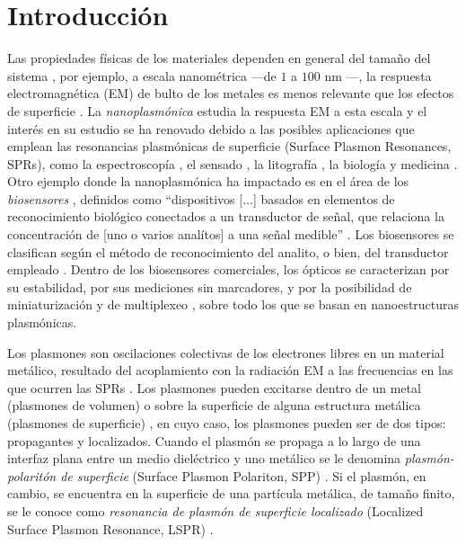 \chapter*{Introducción}
\label{chapter:Motivacion}


Las propiedades físicas de los materiales dependen en general del tamaño del sistema \cite{boverhof2015comparative}, por ejemplo, a escala nanom\'etrica ---de $1$ a $100$ nm \cite{boverhof2015comparative}---, la respuesta electromagn\'etica (EM) de bulto de los metales es menos relevante que los efectos de superficie \cite{zhao2008methods}.  La \emph{nanoplasm\'onica} estudia la respuesta EM a esta escala y el inter\'es en su estudio se ha renovado debido a las posibles aplicaciones que emplean las resonancias plasm\'onicas de superficie (Surface Plasmon Resonances, SPRs), como la espectroscop\'ia \cite{novotny2006principles}, el sensado \cite{jain2008noble}, la litograf\'ia \cite{stockman2011nanoplasmonics}, la biolog\'ia y  medicina \cite{jain2008noble}. Otro ejemplo donde la nanoplasmónica ha impactado es en el área de los \textit{biosensores} \cite{estevez2014trends,mun2015nanobiosensors}, definidos como ``dispositivos [$\ldots$] basados en elementos de reconocimiento biológico conectados a un transductor de señal, que relaciona la concentración de [uno o varios analítos] a una señal medible'' \cite{mun2015nanobiosensors}. Los biosensores se clasifican según el método de reconocimiento del analito, o bien, del transductor empleado \cite{mun2015nanobiosensors}. Dentro de los biosensores comerciales, los ópticos se caracterizan por su estabilidad, por sus mediciones sin marcadores, y por la  posibilidad de miniaturización y de multiplexeo \cite{estevez2014trends}, sobre todo los que se basan en nanoestructuras plasmónicas.

Los plasmones son oscilaciones colectivas de los electrones libres en un material metálico,  resultado del  acoplamiento con la radiaci\'on EM a las frecuencias en las que ocurren las SPRs \cite{stockman2011nanoplasmonics}.  Los plasmones pueden excitarse dentro de un metal (plasmones de volumen) o  sobre la superficie de alguna estructura metálica (plasmones de superficie) \cite{maier2007plasmonics}, en cuyo caso, los plasmones pueden ser de dos tipos: propagantes y localizados.  Cuando el plasmón se propaga a lo largo de una interfaz plana entre un medio diel\'ectrico y uno met\'alico se le denomina  \emph{plasm\'on-polarit\'on de superficie} (Surface Plasmon Polariton, SPP) \cite{maier2007plasmonics}.  Si el plasmón, en cambio, se encuentra en la superficie de una partícula  met\'alica, de tamaño finito, se le conoce como \emph{resonancia de plasm\'on de superficie localizado} (Localized Surface Plasmon Resonance, LSPR) \cite{maier2007plasmonics}.

